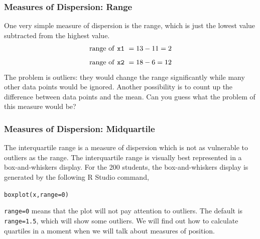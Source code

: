 \documentclass[xcolor=dvipsnames]{beamer}
\begin{document}
\begin{frame}
  \frametitle{Measures of Dispersion: Range}
One very simple measure of dispersion is the \alert{range}, which is
just the lowest value subtracted from the highest value. 
\begin{equation}
  \label{eq:ungoliex}
  \mbox{range of \texttt{x1} }=13-11=2
\end{equation}
\begin{equation}
  \label{eq:aengoore}
  \mbox{range of \texttt{x2} }=18-6=12
\end{equation}
The problem is outliers: they would change the range significantly
while many other data points would be ignored. Another possibility is
to count up the difference between data points and the mean. Can you
guess what the problem of this measure would be?
\end{frame}

\begin{frame}
  \frametitle{Measures of Dispersion: Midquartile}
The \alert{interquartile range} is a measure of dispersion which is not as
vulnerable to outliers as the range. The interquartile range is
visually best represented in a box-and-whiskers display. For the 200
students, the box-and-whiskers display is generated by the following R
Studio command,
\begin{alltt}
boxplot(x,range=0)
\end{alltt}
\texttt{range=0} means that the plot will not pay attention to
outliers. The default is \texttt{range=1.5}, which will show some
outliers. We will find out how to calculate quartiles in a moment when
we will talk about measures of position.
\end{frame}

\end{document}
